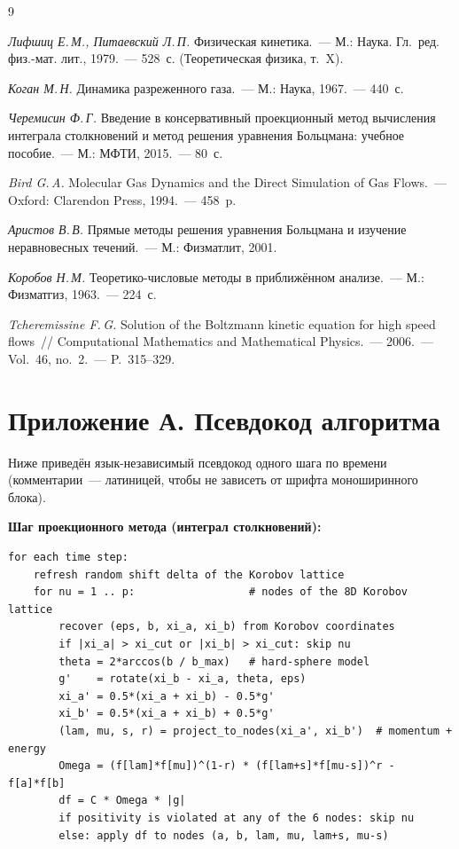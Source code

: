 \documentclass[14pt,a4paper]{extreport}
\numberwithin{equation}{chapter}
\numberwithin{figure}{chapter}
\numberwithin{table}{chapter}
\begin{document}
\begin{thebibliography}{9}

 \emph{Лифшиц Е.\,М., Питаевский Л.\,П.} Физическая кинетика.~--- М.: Наука. Гл.~ред.
физ.-мат. лит., 1979.~--- 528~с. (Теоретическая физика, т.~X).

 \emph{Коган М.\,Н.} Динамика разреженного газа.~--- М.: Наука, 1967.~--- 440~с.

 \emph{Черемисин Ф.\,Г.} Введение в консервативный проекционный метод вычисления
интеграла столкновений и метод решения уравнения Больцмана: учебное пособие.~--- М.: МФТИ, 2015.~--- 80~с.

 \emph{Bird G.\,A.} Molecular Gas Dynamics and the Direct Simulation of Gas Flows.~---
Oxford: Clarendon Press, 1994.~--- 458~p.

 \emph{Аристов В.\,В.} Прямые методы решения уравнения Больцмана и изучение неравновесных
течений.~--- М.: Физматлит, 2001.

 \emph{Коробов Н.\,М.} Теоретико-числовые методы в приближённом анализе.~--- М.:
Физматгиз, 1963.~--- 224~с.

 \emph{Tcheremissine F.\,G.} Solution of the Boltzmann kinetic equation for high speed
flows~// Computational Mathematics and Mathematical Physics.~--- 2006.~--- Vol.~46, no.~2.~--- P.~315--329.
\end{thebibliography}



\chapter*{Приложение А. Псевдокод алгоритма}

Ниже приведён язык-независимый псевдокод одного шага по времени (комментарии~--- латиницей, чтобы не зависеть от шрифта
моноширинного блока).

\medskip
\noindent\textbf{Шаг проекционного метода (интеграл столкновений):}
{\footnotesize
\begin{verbatim}
for each time step:
    refresh random shift delta of the Korobov lattice
    for nu = 1 .. p:                  # nodes of the 8D Korobov lattice
        recover (eps, b, xi_a, xi_b) from Korobov coordinates
        if |xi_a| > xi_cut or |xi_b| > xi_cut: skip nu
        theta = 2*arccos(b / b_max)   # hard-sphere model
        g'    = rotate(xi_b - xi_a, theta, eps)
        xi_a' = 0.5*(xi_a + xi_b) - 0.5*g'
        xi_b' = 0.5*(xi_a + xi_b) + 0.5*g'
        (lam, mu, s, r) = project_to_nodes(xi_a', xi_b')  # momentum + energy
        Omega = (f[lam]*f[mu])^(1-r) * (f[lam+s]*f[mu-s])^r - f[a]*f[b]
        df = C * Omega * |g|
        if positivity is violated at any of the 6 nodes: skip nu
        else: apply df to nodes (a, b, lam, mu, lam+s, mu-s)
\end{verbatim}
}
\end{document}
